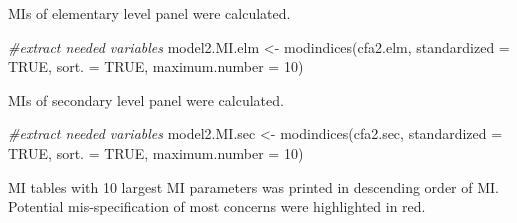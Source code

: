 \documentclass[
]{article}
\newenvironment{Shaded}{\begin{snugshade}}{\end{snugshade}}
\newcommand{\AttributeTok}[1]{\textcolor[rgb]{0.77,0.63,0.00}{#1}}
\newcommand{\CommentTok}[1]{\textcolor[rgb]{0.56,0.35,0.01}{\textit{#1}}}
\newcommand{\ConstantTok}[1]{\textcolor[rgb]{0.00,0.00,0.00}{#1}}
\newcommand{\DecValTok}[1]{\textcolor[rgb]{0.00,0.00,0.81}{#1}}
\newcommand{\FunctionTok}[1]{\textcolor[rgb]{0.00,0.00,0.00}{#1}}
\newcommand{\NormalTok}[1]{#1}
\newcommand{\OtherTok}[1]{\textcolor[rgb]{0.56,0.35,0.01}{#1}}
\begin{document}
MIs of elementary level panel were calculated.

\begin{Shaded}
\begin{Highlighting}[]
\CommentTok{\#extract needed variables}
\NormalTok{model2.MI.elm }\OtherTok{\textless{}{-}} 
  \FunctionTok{modindices}\NormalTok{(cfa2.elm,}
             \AttributeTok{standardized =} \ConstantTok{TRUE}\NormalTok{,}
             \AttributeTok{sort. =} \ConstantTok{TRUE}\NormalTok{,}
             \AttributeTok{maximum.number =} \DecValTok{10}\NormalTok{)}
\end{Highlighting}
\end{Shaded}

MIs of secondary level panel were calculated.

\begin{Shaded}
\begin{Highlighting}[]
\CommentTok{\#extract needed variables}
\NormalTok{model2.MI.sec }\OtherTok{\textless{}{-}} 
  \FunctionTok{modindices}\NormalTok{(cfa2.sec,}
             \AttributeTok{standardized =} \ConstantTok{TRUE}\NormalTok{,}
             \AttributeTok{sort. =} \ConstantTok{TRUE}\NormalTok{,}
             \AttributeTok{maximum.number =} \DecValTok{10}\NormalTok{)}
\end{Highlighting}
\end{Shaded}

MI tables with 10 largest MI parameters was printed in descending order of MI. Potential mis-specification of most concerns were highlighted in red.
\end{document}
